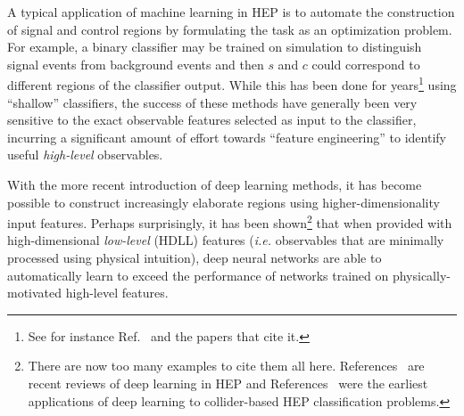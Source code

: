 \documentclass[reprint,nofootinbib,...]{revtex4-1}
\begin{document}
A typical application of machine learning in HEP is to automate the construction of signal and control regions by formulating the task as an optimization problem.  For example, a binary classifier may be trained on simulation to distinguish signal events from background events and then $s$ and $c$ could correspond to different regions of the classifier output.  While this has been done for years\footnote{See for instance Ref.~\cite{Hocker:2007ht} and the papers that cite it.} using ``shallow'' classifiers, the success of these methods have generally been very sensitive to the exact observable features selected as input to the classifier, incurring a significant amount of effort towards ``feature engineering'' to identify useful \textit{high-level} observables.

With the more recent introduction of deep learning methods, it has become possible to construct increasingly elaborate regions using higher-dimensionality input features.
Perhaps surprisingly, it has been shown\footnote{There are now too many examples to cite them all here.  References~\cite{Larkoski:2017jix,Radovic:2018dip,Guest:2018yhq} are recent reviews of deep learning in HEP and References~\cite{Baldi:2014kfa,deOliveira:2015xxd,Baldi:2016fql,Guest:2016iqz} were the earliest applications of deep learning to collider-based HEP classification problems.} that when provided with high-dimensional \textit{low-level} (HDLL) features (\textit{i.e.} observables that are minimally processed using physical intuition), deep neural networks are able to automatically learn to exceed the performance of networks trained on physically-motivated high-level features.

\end{document}
